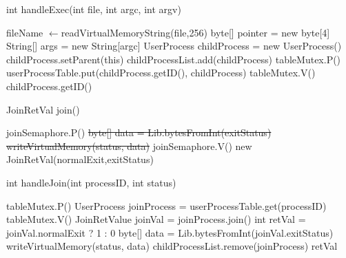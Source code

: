 \documentclass{article}
\renewcommand{\gets}{%
  \ensuremath{\leftarrow}}
\begin{document}
\begin{spacing}{1.1}
\begin{algorithm}[H]
  \label{alg:handleExec}
  \caption{int \textsf{handleExec}(int file, int argc, int argv)}
  fileName\gets\textsf{readVirtualMemoryString}(file,256)\;
   {
    \;
  }
  byte[] pointer = new byte[4]\;
  String[] args = new String[argc]\;
  UserProcess childProcess = new UserProcess()\;
   {
    \;
  }
  childProcess.setParent(this)\;
  childProcessList.add(childProcess)\;
  \colorbox{myyellow}{tableMutex.P()}\;
  userProcessTable.put(childProcess.getID(), childProcess)\;
  \colorbox{myyellow}{tableMutex.V()}\;
  \Return childProcess.getID()\;
\end{algorithm}

\begin{algorithm}
  \label{alg:join}
  \caption{JoinRetVal \textsf{join}()}
  joinSemaphore.P()\;
  {\color{red}\sout{byte[] data = Lib.bytesFromInt(exitStatus)}\;
  \sout{writeVirtualMemory(status, data)}\;}
  joinSemaphore.V()\;
  {\color{red}\Return new JoinRetVal(normalExit,exitStatus)\;}
\end{algorithm}

\begin{algorithm}[H]
  \label{alg:handleJoin}
  \caption{int \textsf{handleJoin}(int processID, int status)}
  \colorbox{myyellow}{tableMutex.P()}\;
  UserProcess joinProcess = userProcessTable.get(processID)\;
  \colorbox{myyellow}{tableMutex.V()}\;
  {\color{red}
   {
  \;
   {
  \;
  }
  }
  JoinRetValue joinVal = joinProcess.join()\;
  int retVal = joinVal.normalExit ? 1 : 0\;
  byte[] data = Lib.bytesFromInt(joinVal.exitStatus)\;
  writeVirtualMemory(status, data)\; }
  childProcessList.remove(joinProcess)\;
  \Return retVal\;
\end{algorithm}


\end{spacing}
\end{document}
